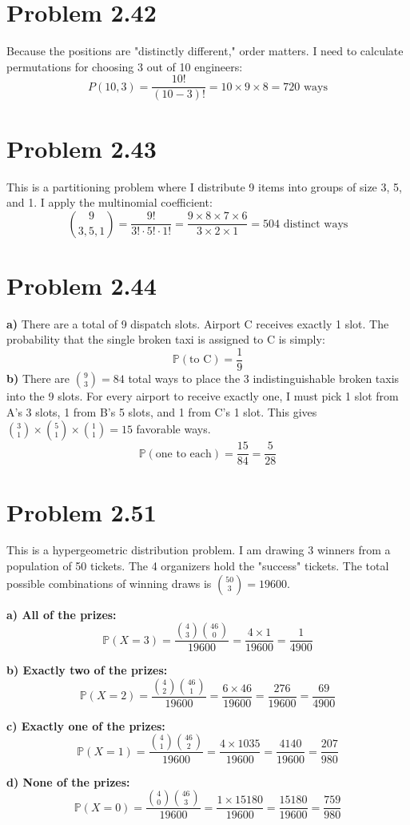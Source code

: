 \documentclass[11pt, letterpaper]{article}
\newcommand{\Prob}{\mathbb{P}}
\begin{document}
\section*{Problem 2.42}
Because the positions are "distinctly different," order matters. I need to calculate permutations for choosing 3 out of 10 engineers:
\[ P(10, 3) = \frac{10!}{(10-3)!} = 10 \times 9 \times 8 = 720 \text{ ways} \]

\section*{Problem 2.43}
This is a partitioning problem where I distribute 9 items into groups of size 3, 5, and 1. I apply the multinomial coefficient:
\[ \binom{9}{3, 5, 1} = \frac{9!}{3! \cdot 5! \cdot 1!} = \frac{9 \times 8 \times 7 \times 6}{3 \times 2 \times 1} = 504 \text{ distinct ways} \]

\section*{Problem 2.44}
\textbf{a)} There are a total of 9 dispatch slots. Airport C receives exactly 1 slot. The probability that the single broken taxi is assigned to C is simply:
\[ \Prob(\text{to C}) = \frac{1}{9} \]
\textbf{b)} There are $\binom{9}{3} = 84$ total ways to place the 3 indistinguishable broken taxis into the 9 slots. For every airport to receive exactly one, I must pick 1 slot from A's 3 slots, 1 from B's 5 slots, and 1 from C's 1 slot. This gives $\binom{3}{1} \times \binom{5}{1} \times \binom{1}{1} = 15$ favorable ways.
\[ \Prob(\text{one to each}) = \frac{15}{84} = \frac{5}{28} \]

\section*{Problem 2.51}
This is a hypergeometric distribution problem. I am drawing 3 winners from a population of 50 tickets. The 4 organizers hold the "success" tickets. The total possible combinations of winning draws is $\binom{50}{3} = 19600$.

\textbf{a) All of the prizes:}
\[ \Prob(X = 3) = \frac{\binom{4}{3}\binom{46}{0}}{19600} = \frac{4 \times 1}{19600} = \frac{1}{4900} \]

\textbf{b) Exactly two of the prizes:}
\[ \Prob(X = 2) = \frac{\binom{4}{2}\binom{46}{1}}{19600} = \frac{6 \times 46}{19600} = \frac{276}{19600} = \frac{69}{4900} \]

\textbf{c) Exactly one of the prizes:}
\[ \Prob(X = 1) = \frac{\binom{4}{1}\binom{46}{2}}{19600} = \frac{4 \times 1035}{19600} = \frac{4140}{19600} = \frac{207}{980} \]

\textbf{d) None of the prizes:}
\[ \Prob(X = 0) = \frac{\binom{4}{0}\binom{46}{3}}{19600} = \frac{1 \times 15180}{19600} = \frac{15180}{19600} = \frac{759}{980} \]
\end{document}
